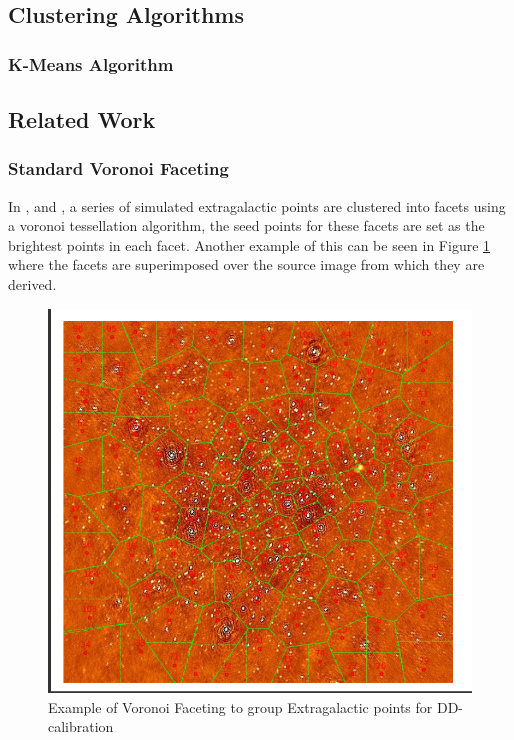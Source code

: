 \subsection{Clustering Algorithms} \label{tes:sec:clu}
%
\subsubsection{K-Means Algorithm}\label{tes:ssec:kma}
\subsection{Related Work}\label{ra:sec:rw}
%
\subsubsection{Standard Voronoi Faceting}\label{ra:ssec:svf}
In \cite{tasse2014applying}, \cite{smirnov2015radio} and \cite{van2016lofar}, a series of simulated extragalactic points are clustered into facets using a voronoi tessellation algorithm, the seed points for these facets are set as the brightest points in each facet. Another example of this can be seen in Figure \ref{tes:fig:stelvor} where the facets are superimposed over the source image from which they are derived.
%
\begin{figure}[H]
    \centering
    \includegraphics[scale=0.4]{Images/tessellation.png}
    \caption{Example of Voronoi Faceting to group Extragalactic points for DD-calibration \citep{oleg}}
    \label{tes:fig:stelvor}
\end{figure}
